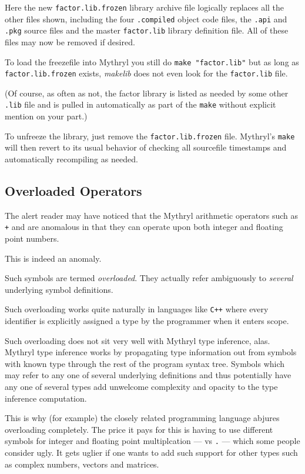Here the new {\tt factor.lib.frozen} library archive file logically 
replaces all the other files shown, including the four {\tt .compiled} 
object code files, the {\tt .api} and {\tt .pkg} source files and 
the master {\tt factor.lib} library definition file.  All of 
these files may now be removed if desired.

To load the freezefile into Mythryl you still do {\tt make "factor.lib"} 
but as long as {\tt factor.lib.frozen} exists, {\it makelib} does not even 
look for the {\tt factor.lib} file.

(Of course, as often as not, the factor library is listed as needed by 
some other {\tt .lib} file and is pulled in automatically as part of 
the {\tt make} without explicit mention on your part.)

To unfreeze the library, just remove the {\tt factor.lib.frozen} file. 
Mythryl's {\tt make} will then revert to its usual behavior of checking 
all sourcefile timestamps and automatically recompiling as needed.


\cutend*

\subsection{Overloaded Operators}

The alert reader may have noticed that the Mythryl arithmetic operators such as 
{\tt +} and {\tt *} are anomalous in that they can operate upon both integer 
and floating point numbers.

This is indeed an anomaly.

Such symbols are termed {\it overloaded}.  They actually refer ambiguously 
to {\it several} underlying symbol definitions.

Such overloading works quite naturally in languages like {\tt C++} where 
every identifier is explicitly assigned a type by the programmer  
when it enters scope.

Such overloading does not sit very well with Mythryl type inference, alas. 
Mythryl type inference works by propagating 
type information out from symbols with known type through the rest of the 
program syntax tree.  Symbols which may refer to any one of several underlying 
definitions and thus potentially have any one of several types add unwelcome 
complexity and opacity to the type inference computation.

This is why (for example) the closely related 
 programming language abjures overloading completely. 
The price it pays for this is having to use different symbols for integer 
and floating point multiplcation --- {\tt *} vs {\tt *.} --- which some people consider 
ugly. It gets uglier if one wants to add such support for other types 
such as complex numbers, vectors and matrices.

